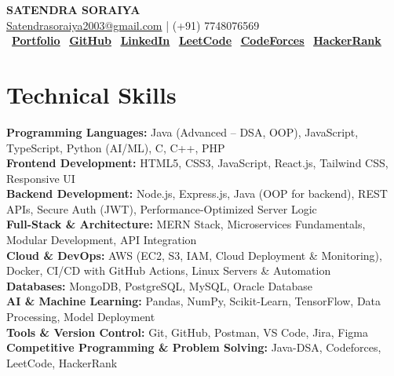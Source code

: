 \documentclass[a4paper,11pt]{article}
\begin{document}
\pagestyle{empty}
\vspace*{-15pt}


\begin{center}
    {\Large \textbf{SATENDRA SORAIYA}}\\[2pt]
    \normalsize\href{mailto:Satendrasoraiya2003@gmail.com}{Satendrasoraiya2003@gmail.com}
    \;|\; (+91) 7748076569 \\[4pt]

    \small
    \,
    \href{https://my-portfolio-97ql6h5vz-satendra-soraiya-s-projects.vercel.app/}{\underline{\textbf{Portfolio}}}
    \quad
    \faGithub\,
    \href{https://github.com/Satendra-Soraiya}{\underline{\textbf{GitHub}}}
    \quad
    \faLinkedin\,
    \href{https://www.linkedin.com/in/satendra-soraiya-24280224a/}{\underline{\textbf{LinkedIn}}}
    \quad
    \faLaptopCode\,
    \href{https://leetcode.com/u/satendrasoraiya1/}{\underline{\textbf{LeetCode}}}
    \quad
    \faCode\,
    \href{https://codeforces.com/profile/satendra_soraiya}{\underline{\textbf{CodeForces}}}
    \quad
    \faHackerrank\,
    \href{https://www.hackerrank.com/profile/satendrasoraiya1}{\underline{\textbf{HackerRank}}}
\end{center}


\section*{Technical Skills}

\textbf{Programming Languages:} Java (Advanced – DSA, OOP), JavaScript, TypeScript, Python (AI/ML), C, C++, PHP \\
\textbf{Frontend Development:} HTML5, CSS3, JavaScript, React.js, Tailwind CSS, Responsive UI \\
\textbf{Backend Development:} Node.js, Express.js, Java (OOP for backend), REST APIs, Secure Auth (JWT), Performance-Optimized Server Logic \\
\textbf{Full-Stack \& Architecture:} MERN Stack, Microservices Fundamentals, Modular Development, API Integration \\
\textbf{Cloud \& DevOps:} AWS (EC2, S3, IAM, Cloud Deployment \& Monitoring), Docker, CI/CD with GitHub Actions, Linux Servers \& Automation \\
\textbf{Databases:} MongoDB, PostgreSQL, MySQL, Oracle Database \\
\textbf{AI \& Machine Learning:} Pandas, NumPy, Scikit-Learn, TensorFlow, Data Processing, Model Deployment \\
\textbf{Tools \& Version Control:} Git, GitHub, Postman, VS Code, Jira, Figma \\
\textbf{Competitive Programming \& Problem Solving:} Java-DSA, Codeforces, LeetCode, HackerRank
\end{document}
